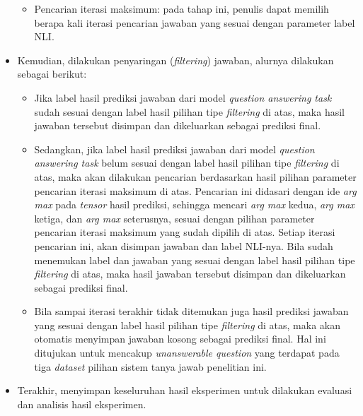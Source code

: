 \begin{itemize}
\begin{itemize}
        \item Pencarian iterasi maksimum: pada tahap ini, penulis dapat memilih berapa kali iterasi pencarian jawaban yang sesuai dengan parameter label NLI.
        
    \end{itemize}
    
    \item Kemudian, dilakukan penyaringan (\emph{filtering}) jawaban, alurnya dilakukan sebagai berikut:
    
    \begin{itemize}
        
        \item Jika label hasil prediksi jawaban dari model \emph{question answering task} sudah sesuai dengan label hasil pilihan tipe \emph{filtering} di atas, maka hasil jawaban tersebut disimpan dan dikeluarkan sebagai prediksi final.
        
        \item Sedangkan, jika label hasil prediksi jawaban dari model \emph{question answering task} belum sesuai dengan label hasil pilihan tipe \emph{filtering} di atas, maka akan dilakukan pencarian berdasarkan hasil pilihan parameter pencarian iterasi maksimum di atas. Pencarian ini didasari dengan ide \emph{arg max} pada \emph{tensor} hasil prediksi, sehingga mencari \emph{arg max} kedua, \emph{arg max} ketiga, dan \emph{arg max} seterusnya, sesuai dengan pilihan parameter pencarian iterasi maksimum yang sudah dipilih di atas. Setiap iterasi pencarian ini, akan disimpan jawaban dan label NLI-nya. Bila sudah menemukan label dan jawaban yang sesuai dengan label hasil pilihan tipe \emph{filtering} di atas, maka hasil jawaban tersebut disimpan dan dikeluarkan sebagai prediksi final.
        
        \item Bila sampai iterasi terakhir tidak ditemukan juga hasil prediksi jawaban yang sesuai dengan label hasil pilihan tipe \emph{filtering} di atas, maka akan otomatis menyimpan jawaban kosong sebagai prediksi final. Hal ini ditujukan untuk mencakup \emph{unanswerable question} yang terdapat pada tiga \emph{dataset} pilihan sistem tanya jawab penelitian ini.
        
    \end{itemize}
    
    \item Terakhir, menyimpan keseluruhan hasil eksperimen untuk dilakukan evaluasi dan analisis hasil eksperimen.

\end{itemize}

